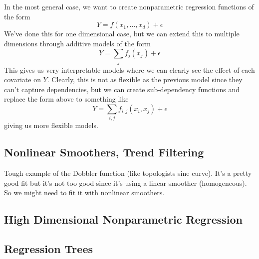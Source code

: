     In the most general case, we want to create nonparametric regression functions of the form 
    \begin{equation}
      Y = f(x_1, \ldots, x_d) + \epsilon 
    \end{equation}
    We've done this for one dimensional case, but we can extend this to multiple dimensions through additive models of the form 
    \begin{equation}
      Y = \sum_j f_j (x_j)  + \epsilon
    \end{equation}
    This gives us very interpretable models where we can clearly see the effect of each covariate on $Y$. Clearly, this is not as flexible as the previous model since they can't capture dependencies, but we can create sub-dependency functions and replace the form above to something like 
    \begin{equation}
      Y = \sum_{i, j} f_{i, j} (x_i, x_j) + \epsilon
    \end{equation}
    giving us more flexible models. 
  
  \subsection{Nonlinear Smoothers, Trend Filtering} 

    Tough example of the Dobbler function (like topologists sine curve). It's a pretty good fit but it's not too good since it's using a linear smoother (homogeneous). So we might need to fit it with nonlinear smoothers. 

  \subsection{High Dimensional Nonparametric Regression}

  \subsection{Regression Trees}

